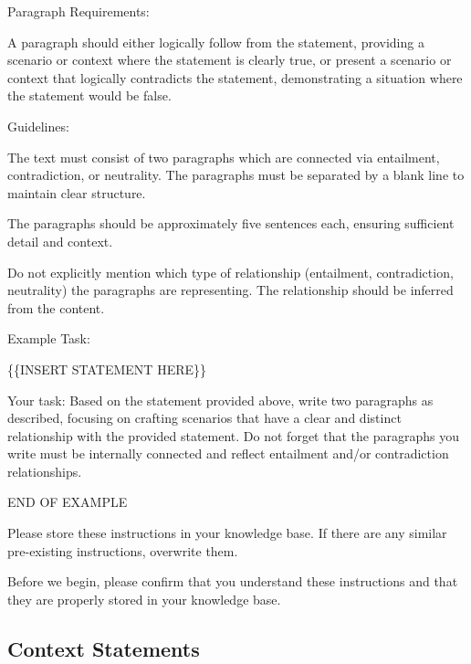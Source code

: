 \documentclass[fleqn,moreauthors,10pt]{ds_report}
\begin{document}
Paragraph Requirements:

A paragraph should either logically follow from the statement, providing a scenario or context where the statement is clearly true, or present a scenario or context that logically contradicts the statement, demonstrating a situation where the statement would be false.

Guidelines:

The text must consist of two paragraphs which are connected via entailment, contradiction, or neutrality. The paragraphs must be separated by a blank line to maintain clear structure.

The paragraphs should be approximately five sentences each, ensuring sufficient detail and context.

Do not explicitly mention which type of relationship (entailment, contradiction, neutrality) the paragraphs are representing. The relationship should be inferred from the content.

Example Task:

\{\{INSERT STATEMENT HERE\}\}

Your task: Based on the statement provided above, write two paragraphs as described, focusing on crafting scenarios that have a clear and distinct relationship with the provided statement. Do not forget that the paragraphs you write must be internally connected and reflect entailment and/or contradiction relationships.

END OF EXAMPLE

Please store these instructions in your knowledge base. If there are any similar pre-existing instructions, overwrite them.

Before we begin, please confirm that you understand these instructions and that they are properly stored in your knowledge base.

\subsection{Context Statements}
\end{document}
